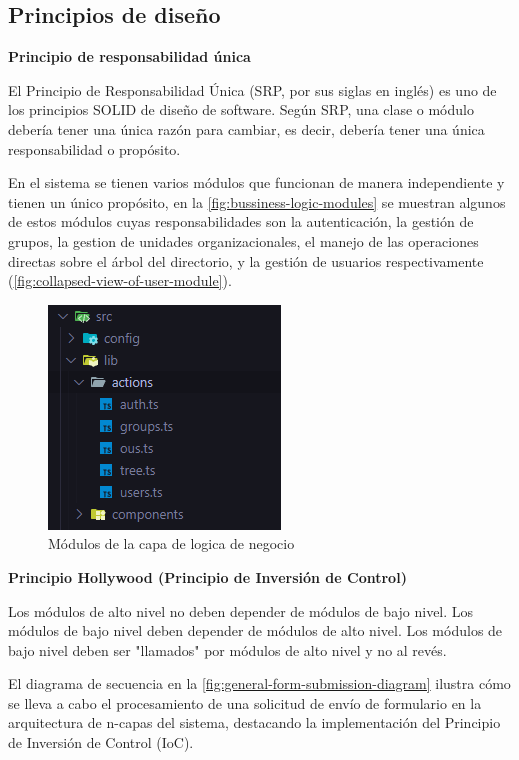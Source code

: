 \subsection{Principios de diseño}

\textbf{Principio de responsabilidad única}

El Principio de Responsabilidad Única (SRP, por sus siglas en inglés) es uno de los principios SOLID de diseño de software. Según SRP, una clase o módulo debería tener una única razón para cambiar, es decir, debería tener una única responsabilidad o propósito.

En el sistema se tienen varios módulos que funcionan de manera independiente y tienen un único propósito, en la \autoref{fig:bussiness-logic-modules} se muestran algunos de estos módulos cuyas responsabilidades son la autenticación, la gestión de grupos, la gestion de unidades organizacionales, el manejo de las operaciones directas sobre el árbol del directorio, y la gestión de usuarios respectivamente (\autoref{fig:collapsed-view-of-user-module}).

\begin{figure}[h]
    \centering
    \includegraphics{images/code/bussiness-logic-modules.png}
    \caption{Módulos de la capa de logica de negocio}
    \label{fig:bussiness-logic-modules}
\end{figure}

\textbf{Principio Hollywood (Principio de Inversión de Control)}

Los módulos de alto nivel no deben depender de módulos de bajo nivel. Los módulos de bajo nivel deben depender de módulos de alto nivel. Los módulos de bajo nivel deben ser "llamados" por módulos de alto nivel y no al revés.

El diagrama de secuencia en la \autoref{fig:general-form-submission-diagram} ilustra cómo se lleva a cabo el procesamiento de una solicitud de envío de formulario en la arquitectura de n-capas del sistema, destacando la implementación del Principio de Inversión de Control (IoC).

